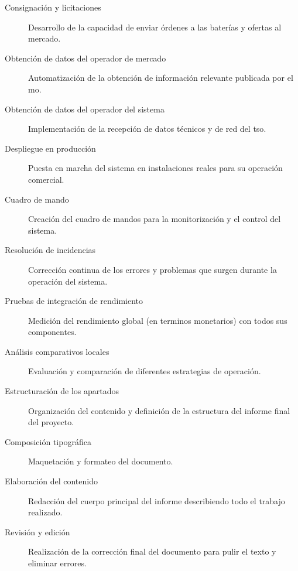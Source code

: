 \begin{description}
  \item[Consignación y licitaciones] Desarrollo de la capacidad de enviar órdenes a las baterías y ofertas al mercado.

  \item[Obtención de datos del operador de mercado] Automatización de la obtención de información relevante publicada por el \gls{mo}.

  \item[Obtención de datos del operador del sistema] Implementación de la recepción de datos técnicos y de red del \gls{tso}.

  \item[Despliegue en producción] Puesta en marcha del sistema en instalaciones reales para su operación comercial.

  \item[Cuadro de mando] Creación del cuadro de mandos para la monitorización y el control del sistema.

  \item[Resolución de incidencias] Corrección continua de los errores y problemas que surgen durante la operación del sistema.

  \item[Pruebas de integración de rendimiento] Medición del rendimiento global (en terminos monetarios) con todos sus componentes.

  \item[Análisis comparativos locales] Evaluación y comparación de diferentes estrategias de operación.

  \item[Estructuración de los apartados] Organización del contenido y definición de la estructura del informe final del proyecto.

  \item[Composición tipográfica] Maquetación y formateo del documento.

  \item[Elaboración del contenido] Redacción del cuerpo principal del informe describiendo todo el trabajo realizado.

  \item[Revisión y edición] Realización de la corrección final del documento para pulir el texto y eliminar errores.

\end{description}
